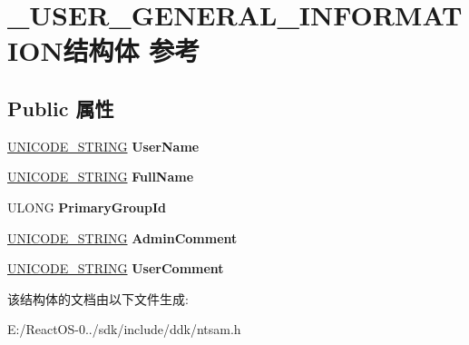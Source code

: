 \hypertarget{struct___u_s_e_r___g_e_n_e_r_a_l___i_n_f_o_r_m_a_t_i_o_n}{}\section{\+\_\+\+U\+S\+E\+R\+\_\+\+G\+E\+N\+E\+R\+A\+L\+\_\+\+I\+N\+F\+O\+R\+M\+A\+T\+I\+O\+N结构体 参考}
\label{struct___u_s_e_r___g_e_n_e_r_a_l___i_n_f_o_r_m_a_t_i_o_n}
\subsection*{Public 属性}
\begin{DoxyCompactItemize}
\item 
\mbox{\label{struct___u_s_e_r___g_e_n_e_r_a_l___i_n_f_o_r_m_a_t_i_o_n_af7e0f247233a00ffd5eb252fd08b91f3}} 
\hyperlink{struct___u_n_i_c_o_d_e___s_t_r_i_n_g}{U\+N\+I\+C\+O\+D\+E\+\_\+\+S\+T\+R\+I\+NG} {\bfseries User\+Name}
\item 
\mbox{\label{struct___u_s_e_r___g_e_n_e_r_a_l___i_n_f_o_r_m_a_t_i_o_n_a07e5911a7523b97c518b7e40adfae84b}} 
\hyperlink{struct___u_n_i_c_o_d_e___s_t_r_i_n_g}{U\+N\+I\+C\+O\+D\+E\+\_\+\+S\+T\+R\+I\+NG} {\bfseries Full\+Name}
\item 
\mbox{\label{struct___u_s_e_r___g_e_n_e_r_a_l___i_n_f_o_r_m_a_t_i_o_n_a56364118b8015454a01efa16a67fdfa8}} 
U\+L\+O\+NG {\bfseries Primary\+Group\+Id}
\item 
\mbox{\label{struct___u_s_e_r___g_e_n_e_r_a_l___i_n_f_o_r_m_a_t_i_o_n_aa46a070648206e1dc6eaec8ca16f6957}} 
\hyperlink{struct___u_n_i_c_o_d_e___s_t_r_i_n_g}{U\+N\+I\+C\+O\+D\+E\+\_\+\+S\+T\+R\+I\+NG} {\bfseries Admin\+Comment}
\item 
\mbox{\label{struct___u_s_e_r___g_e_n_e_r_a_l___i_n_f_o_r_m_a_t_i_o_n_a8efa931dd592b0c22b00463443c1c3b3}} 
\hyperlink{struct___u_n_i_c_o_d_e___s_t_r_i_n_g}{U\+N\+I\+C\+O\+D\+E\+\_\+\+S\+T\+R\+I\+NG} {\bfseries User\+Comment}
\end{DoxyCompactItemize}


该结构体的文档由以下文件生成\+:\begin{DoxyCompactItemize}
\item 
E\+:/\+React\+O\+S-\/0../sdk/include/ddk/ntsam.\+h\end{DoxyCompactItemize}

